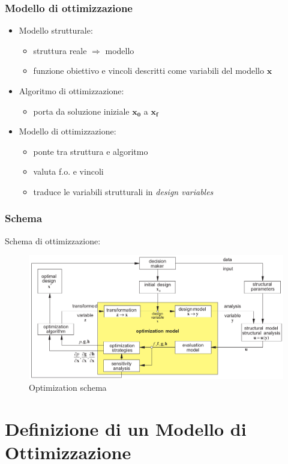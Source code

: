 \documentclass{beamer}
\begin{document}
\begin{frame}
	\frametitle{Modello di ottimizzazione}
	\begin{itemize}
		\item Modello strutturale:
			\begin{itemize}
				\item struttura reale $\Rightarrow$ modello
				\item funzione obiettivo e vincoli descritti come variabili del modello $\mathbf{x}$
			\end{itemize}
		\item Algoritmo di ottimizzazione:
			\begin{itemize}
				\item porta da soluzione iniziale $\mathbf{x_0}$ a $\mathbf{x_f}$
			\end{itemize}
		\item Modello di ottimizzazione:
			\begin{itemize}
				\item ponte tra struttura e algoritmo
				\item valuta f.o. e vincoli
				\item traduce le variabili strutturali in \textit{design variables}
			\end{itemize}
	\end{itemize}
	
\end{frame}


\begin{frame}
	\frametitle{Schema}
	Schema di ottimizzazione:
	\begin{figure}
		\includegraphics[width=0.8\linewidth]{./images/schema.png}
		\caption{Optimization schema \cite{eschenauer1997applied}}
		\label{fig:schema}
	\end{figure}
\end{frame}


\section{Definizione di un Modello di Ottimizzazione}
\end{document}
